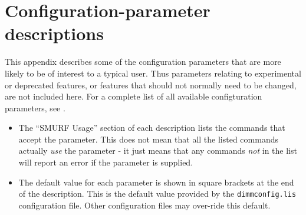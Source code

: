 \chapter{Configuration-parameter descriptions}
\label{app:parameters}

This appendix describes some of the \makemap configuration parameters
that are more likely to be of interest to a typical user. Thus parameters
relating to experimental or deprecated features, or features that should
not normally need to be changed, are not included here. For a complete list
of all available configturation parameters, see
.

\begin{itemize}
\item The ``SMURF Usage'' section of each description lists the \SMURF
commands that accept the parameter. This does not mean that all the
listed commands actually \emph{use} the parameter - it just means that
any commands \emph{not} in the list will report an error if the parameter
is supplied.
\item The default value for each parameter is shown in square brackets at
the end of the description. This is the default value provided by the
\texttt{dimmconfig.lis} configuration file. Other configuration files may
over-ride this default.
\end{itemize}

\sstminitoc{}
\sstnomaintoc

\sstmaintoc

